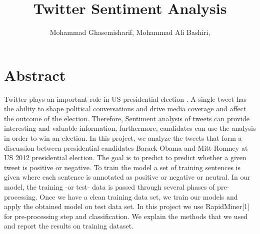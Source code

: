 \documentclass[letterpaper, 12pt]{article}
\title{Twitter Sentiment Analysis}
\author{
Mohammad Ghasemisharif, 
Mohammad Ali Bashiri, 
}
\begin{document}
\maketitle
\newpage

\section{Abstract}


Twitter plays an important role in US presidential election . A single tweet has the ability to shape political conversations and drive media coverage and affect the outcome of the election. Therefore, Sentiment analysis of tweets can provide interesting and valuable information, furthermore,  candidates can use the analysis in order to win an election. In this project, we analyze the tweets that form a discussion between presidential candidates Barack Obama and Mitt Romney at US 2012 presidential election. The goal is to predict to predict whether a given tweet is positive or negative. To train the model a set of training sentences is given where each sentence is annotated as positive or negative or neutral. In our model, the training -or test- data  is passed through several phases of pre-processing. Once we have a clean training data set, we train our models and apply the obtained model on test data set. In this project we use RapidMiner[1] for  pre-processing  step and classification. We explain the methods that we used and report the results on training dataset. 





\vspace*{10pt}
\end{document}
